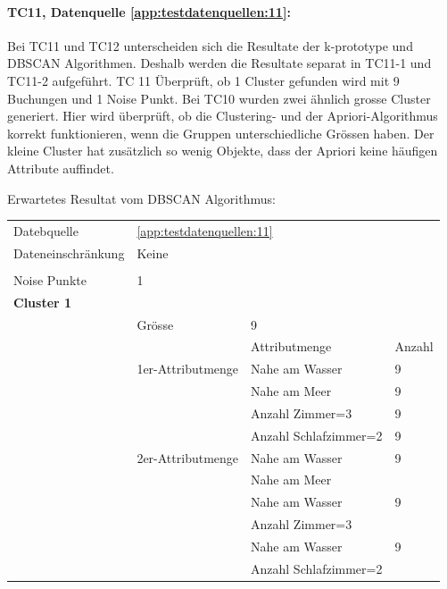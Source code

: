 \paragraph{TC11, Datenquelle \cref{app:testdatenquellen:11}:} Bei TC11 und TC12 unterscheiden sich die Resultate der k-prototype und DBSCAN Algorithmen. Deshalb werden die Resultate separat in TC11-1 und TC11-2 aufgeführt.
TC 11 Überprüft, ob 1 Cluster gefunden wird mit 9 Buchungen und 1 Noise Punkt. Bei TC10 wurden zwei ähnlich grosse Cluster generiert. Hier wird überprüft, ob die Clustering- und der Apriori-Algorithmus korrekt funktionieren, wenn die Gruppen unterschiedliche Grössen haben. Der kleine Cluster hat zusätzlich so wenig Objekte, dass der Apriori keine häufigen Attribute auffindet.

Erwartetes Resultat vom DBSCAN Algorithmus:
\begin{longtable}{ | l | l | l | l |} 	
	\hline 
	\rowcolor{tableheadcolor}
	\multicolumn{4}{|l|}{\bfseries ID: TC11-1 DBSCAN} \\ \hline 
	Datebquelle & \multicolumn{3}{|l|}{\cref{app:testdatenquellen:11}} \\ \hline 
	Dateneinschränkung & \multicolumn{3}{|l|}{Keine} \\ \hline 
	
	\rowcolor{tableheadcolor}
	\multicolumn{4}{|l|}{\bfseries Erwartetes Resultat} \\ \hline 
	Noise Punkte & \multicolumn{3}{|l|}{1} \\ \hline 

	\multicolumn{4}{|l|}{\textbf{Cluster 1}} \\ \cline{2-4} 
	& Grösse & \multicolumn{2}{|l|}{9} \\ \cline{2-4} 
	&& Attributmenge & Anzahl \\ \cline{2-4} 
	
	& 1er-Attributmenge & \tabitem Nahe am Wasser & 9 \\ \cline{3-4} 
	& & \tabitem Nahe am Meer & 9 \\ \cline{3-4} 
	& & \tabitem Anzahl Zimmer=3 & 9 \\ \cline{3-4} 
	& & \tabitem Anzahl Schlafzimmer=2 & 9 \\ \cline{2-4} 
	
	& 2er-Attributmenge & \tabitem Nahe am Wasser & 9 \\
	& & \tabitem Nahe am Meer & \\ \cline{3-4} 
	& & \tabitem Nahe am Wasser & 9 \\
	& & \tabitem Anzahl Zimmer=3 & \\ \cline{3-4} 
	& & \tabitem Nahe am Wasser & 9 \\
	& & \tabitem Anzahl Schlafzimmer=2 & \\ \cline{3-4} 
	

\end{longtable}
